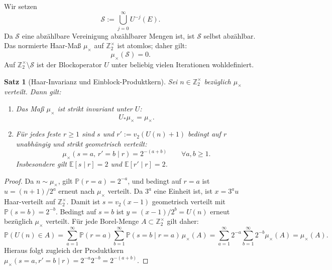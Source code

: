 \documentclass[11pt,reqno]{amsart}
\newtheorem{theorem}{Satz}[section]
\theoremstyle{definition}
\theoremstyle{remark}
\numberwithin{equation}{section}
\begin{document}
Wir setzen
\begin{equation}
\mathcal{S} := \bigcup_{j=0}^\infty U^{-j}(E).
\end{equation}
Da $\mathcal{S}$ eine abz\"ahlbare Vereinigung abzählbarer Mengen ist, ist $\mathcal{S}$ selbst abz\"ahlbar. Das normierte Haar-Ma\ss{} $\mu_\times$ auf $\mathbb{Z}_2^\times$ ist atomlos; daher gilt:
\begin{equation}
\mu_\times(\mathcal{S}) = 0.
\end{equation}
Auf $\mathbb{Z}_2^\times \setminus \mathcal{S}$ ist der Blockoperator $U$ unter beliebig vielen Iterationen wohldefiniert.

\begin{theorem}[Haar-Invarianz und Einblock-Produktkern]
\label{thm:haar_block_kernel}
Sei $n \in \mathbb{Z}_2^\times$ bez\"uglich $\mu_\times$ verteilt. Dann gilt:
\begin{enumerate}
\item Das Ma\ss{} $\mu_\times$ ist strikt invariant unter $U$:
\begin{equation}
U_* \mu_\times = \mu_\times.
\end{equation}
\item F\"ur jedes feste $r \ge 1$ sind $s$ und $r' := v_2(U(n)+1)$ bedingt auf $r$ unabh\"angig und strikt geometrisch verteilt:
\begin{equation}
\mu_\times(s = a, \, r' = b \mid r) = 2^{-(a+b)} \qquad \forall a, b \ge 1.
\end{equation}
Insbesondere gilt $\mathbb{E}[s \mid r] = 2$ und $\mathbb{E}[r' \mid r] = 2$.
\end{enumerate}
\end{theorem}

\begin{proof}
Da $n \sim \mu_\times$, gilt $\mathbb{P}(r = a) = 2^{-a}$, und bedingt auf $r = a$ ist $u = (n+1)/2^a$ erneut nach $\mu_\times$ verteilt. 
Da $3^a$ eine Einheit ist, ist $x = 3^a u$ Haar-verteilt auf $\mathbb{Z}_2^\times$. 
Damit ist $s = v_2(x-1)$ geometrisch verteilt mit $\mathbb{P}(s=b) = 2^{-b}$. 
Bedingt auf $s=b$ ist $y = (x-1)/2^b = U(n)$ erneut bez\"uglich $\mu_\times$ verteilt. 
F\"ur jede Borel-Menge $A \subset \mathbb{Z}_2^\times$ gilt daher:
\begin{equation}
\mathbb{P}(U(n) \in A) = \sum_{a=1}^\infty \mathbb{P}(r = a) \sum_{b=1}^\infty \mathbb{P}(s = b \mid r=a) \, \mu_\times(A) = \sum_{a=1}^\infty 2^{-a} \sum_{b=1}^\infty 2^{-b} \mu_\times(A) = \mu_\times(A).
\end{equation}
Hieraus folgt zugleich der Produktkern $\mu_\times(s=a, r'=b \mid r) = 2^{-a} 2^{-b} = 2^{-(a+b)}$.
\end{proof}
\end{document}
